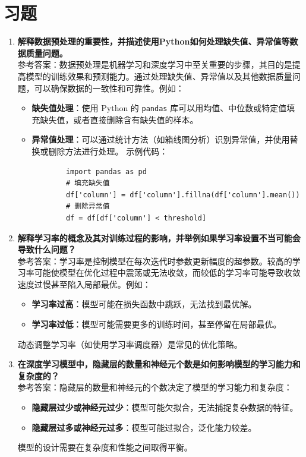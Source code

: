 \section*{习题}
\begin{enumerate}
    \item \textbf{解释数据预处理的重要性，并描述使用Python如何处理缺失值、异常值等数据质量问题。}\\
    参考答案：数据预处理是机器学习和深度学习中至关重要的步骤，其目的是提高模型的训练效果和预测能力。通过处理缺失值、异常值以及其他数据质量问题，可以确保数据的一致性和可靠性。例如：
    \begin{itemize}
        \item \textbf{缺失值处理}：使用 Python 的 \texttt{pandas} 库可以用均值、中位数或特定值填充缺失值，或者直接删除含有缺失值的样本。
        \item \textbf{异常值处理}：可以通过统计方法（如箱线图分析）识别异常值，并使用替换或删除方法进行处理。
        示例代码：
        \begin{verbatim}
        import pandas as pd
        # 填充缺失值
        df['column'] = df['column'].fillna(df['column'].mean())
        # 删除异常值
        df = df[df['column'] < threshold]
        \end{verbatim}
    \end{itemize}

    \item \textbf{解释学习率的概念及其对训练过程的影响，并举例如果学习率设置不当可能会导致什么问题？}\\
    参考答案：学习率是控制模型在每次迭代时参数更新幅度的超参数。较高的学习率可能使模型在优化过程中震荡或无法收敛，而较低的学习率可能导致收敛速度过慢甚至陷入局部最优。例如：
    \begin{itemize}
        \item \textbf{学习率过高}：模型可能在损失函数中跳跃，无法找到最优解。
        \item \textbf{学习率过低}：模型可能需要更多的训练时间，甚至停留在局部最优。
    \end{itemize}
    动态调整学习率（如使用学习率调度器）是常见的优化策略。

    \item \textbf{在深度学习模型中，隐藏层的数量和神经元个数是如何影响模型的学习能力和复杂度的？}\\
    参考答案：隐藏层的数量和神经元的个数决定了模型的学习能力和复杂度：
    \begin{itemize}
        \item \textbf{隐藏层过少或神经元过少}：模型可能欠拟合，无法捕捉复杂数据的特征。
        \item \textbf{隐藏层过多或神经元过多}：模型可能过拟合，泛化能力较差。
    \end{itemize}
    模型的设计需要在复杂度和性能之间取得平衡。


\end{enumerate}

